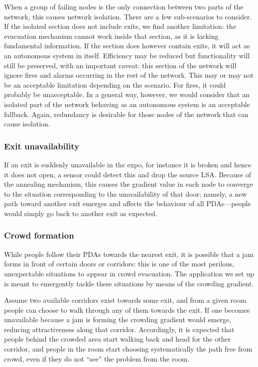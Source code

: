 \documentclass[12pt,a4paper,twoside,openright]{book}
\begin{document}
When a group of failing nodes is the only connection between two parts of the network, this causes network isolation.
%
There are a few sub-scenarios to consider.
%
If the isolated section does not include exits, we find another limitation: the evacuation mechanism cannot work inside that section, as it is lacking fundamental information.
%
If the section does however contain exits, it will act as an autonomous system in itself.
%
Efficiency may be reduced but functionality will still be preserved, with an important caveat: this section of the network will ignore fires and alarms occurring in the rest of the network.
%
This may or may not be an acceptable limitation depending on the scenario.
%
For fires, it could probably be unacceptable.
%
In a general way, however, we would consider that an isolated part of the network behaving as an autonomous system is an acceptable fallback.
%
Again, redundancy is desirable for those nodes of the network that can cause isolation.

\subsubsection{Exit unavailability}

If an exit is suddenly unavailable in the expo, for instance it is broken and hence it does not open, a sensor could detect this and drop the source LSA.
%
Because of the annealing mechanism, this causes the gradient value in each node to converge to the situation corresponding to the unavailability of that door; namely, a new path toward another exit emerges and affects the behaviour of all PDAs---people would simply go back to another exit as expected.

\subsubsection{Crowd formation}

While people follow their PDAs towards the nearest exit, it is possible that a jam forms in front of certain doors or corridors: this is one of the most perilous, unexpectable situations to appear in crowd evacuation.
%
The application we set up is meant to emergently tackle these situations by means of the crowding gradient.

Assume two available corridors exist towards some exit, and from a given room people can choose to walk through any of them towards the exit.
%
If one becomes unavailable because a jam is forming the crowding gradient would emerge, reducing attractiveness along that corridor.
%
Accordingly, it is expected that people behind the crowded area start walking back and head for the other corridor, and people in the room start choosing systematically the path free from crowd, even if they do not ``see'' the problem from the room.
\end{document}

